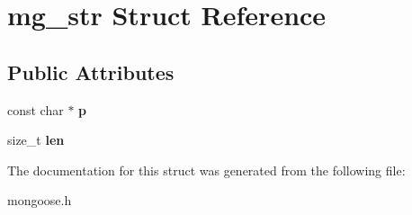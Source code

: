 \hypertarget{structmg__str}{}\section{mg\+\_\+str Struct Reference}
\label{structmg__str}
\subsection*{Public Attributes}
\begin{DoxyCompactItemize}
\item 
\mbox{\label{structmg__str_a1e743a766f92c904d25fe4d058017486}} 
const char $\ast$ {\bfseries p}
\item 
\mbox{\label{structmg__str_a53945bdd422bf389d74b863f23cd4463}} 
size\+\_\+t {\bfseries len}
\end{DoxyCompactItemize}


The documentation for this struct was generated from the following file\+:\begin{DoxyCompactItemize}
\item 
mongoose.\+h\end{DoxyCompactItemize}
